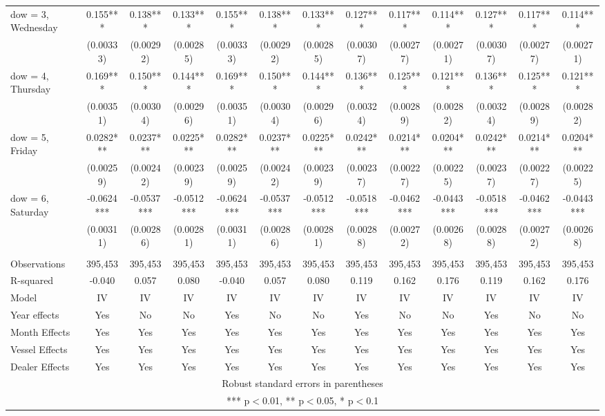 \begin{tabular}{lcccccccccccc}
dow = 3, Wednesday & 0.155*** & 0.138*** & 0.133*** & 0.155*** & 0.138*** & 0.133*** & 0.127*** & 0.117*** & 0.114*** & 0.127*** & 0.117*** & 0.114*** \\
 & (0.00333) & (0.00292) & (0.00285) & (0.00333) & (0.00292) & (0.00285) & (0.00307) & (0.00277) & (0.00271) & (0.00307) & (0.00277) & (0.00271) \\
dow = 4, Thursday & 0.169*** & 0.150*** & 0.144*** & 0.169*** & 0.150*** & 0.144*** & 0.136*** & 0.125*** & 0.121*** & 0.136*** & 0.125*** & 0.121*** \\
 & (0.00351) & (0.00304) & (0.00296) & (0.00351) & (0.00304) & (0.00296) & (0.00324) & (0.00289) & (0.00282) & (0.00324) & (0.00289) & (0.00282) \\
dow = 5, Friday & 0.0282*** & 0.0237*** & 0.0225*** & 0.0282*** & 0.0237*** & 0.0225*** & 0.0242*** & 0.0214*** & 0.0204*** & 0.0242*** & 0.0214*** & 0.0204*** \\
 & (0.00259) & (0.00242) & (0.00239) & (0.00259) & (0.00242) & (0.00239) & (0.00237) & (0.00227) & (0.00225) & (0.00237) & (0.00227) & (0.00225) \\
dow = 6, Saturday & -0.0624*** & -0.0537*** & -0.0512*** & -0.0624*** & -0.0537*** & -0.0512*** & -0.0518*** & -0.0462*** & -0.0443*** & -0.0518*** & -0.0462*** & -0.0443*** \\
 & (0.00311) & (0.00286) & (0.00281) & (0.00311) & (0.00286) & (0.00281) & (0.00288) & (0.00272) & (0.00268) & (0.00288) & (0.00272) & (0.00268) \\
 &  &  &  &  &  &  &  &  &  &  &  &  \\
Observations & 395,453 & 395,453 & 395,453 & 395,453 & 395,453 & 395,453 & 395,453 & 395,453 & 395,453 & 395,453 & 395,453 & 395,453 \\
R-squared & -0.040 & 0.057 & 0.080 & -0.040 & 0.057 & 0.080 & 0.119 & 0.162 & 0.176 & 0.119 & 0.162 & 0.176 \\
Model & IV & IV & IV & IV & IV & IV & IV & IV & IV & IV & IV & IV \\
Year effects & Yes & No & No & Yes & No & No & Yes & No & No & Yes & No & No \\
Month Effects & Yes & Yes & Yes & Yes & Yes & Yes & Yes & Yes & Yes & Yes & Yes & Yes \\
Vessel Effects & Yes & Yes & Yes & Yes & Yes & Yes & Yes & Yes & Yes & Yes & Yes & Yes \\
 Dealer Effects & Yes & Yes & Yes & Yes & Yes & Yes & Yes & Yes & Yes & Yes & Yes & Yes \\ \hline
\multicolumn{13}{c}{ Robust standard errors in parentheses} \\
\multicolumn{13}{c}{ *** p$<$0.01, ** p$<$0.05, * p$<$0.1} \\
\end{tabular}
